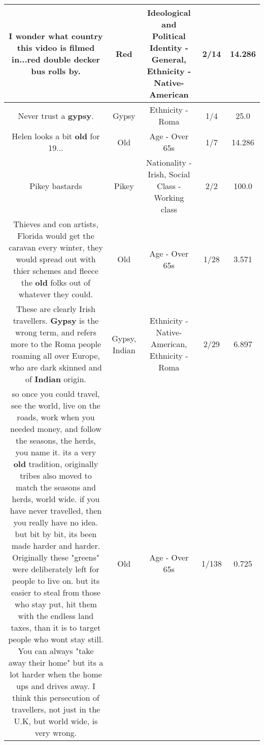 \documentclass[11pt]{article}
\newlength\mylength
\begin{document}
\begin{center}
\begin{longtable}{|C{.65\mylength}|C{.30\mylength}|C{.12\mylength}|C{.12\mylength}|C{.12\mylength}|}
  \small I wonder what country this video is filmed in...\textbf{r\textbf{ed}} double decker bus rolls by.\normalsize   & Red &  Ideological and Political Identity - General, Ethnicity - Native-American & 2/14 & 14.286 \\  \hline
  \small Never trust a \textbf{gypsy}.\normalsize   & Gypsy & Ethnicity - Roma & 1/4 & 25.0 \\  \hline
  \small Helen looks a bit \textbf{old} for 19...\normalsize   & Old & Age - Over 65s & 1/7 & 14.286 \\  \hline
  \small Pikey bastards\normalsize   & Pikey & Nationality - Irish, Social Class - Working class & 2/2 & 100.0 \\  \hline
  \small Thieves and con artists, Florida would get the caravan every winter, they would spread out with thier schemes and fleece the \textbf{old} folks out of whatever they could.\normalsize   & Old & Age - Over 65s & 1/28 & 3.571 \\  \hline
  \small These are clearly Irish travellers. \textbf{Gypsy} is the wrong term, and refers more to the Roma people roaming all over Europe, who are dark skinned and of \textbf{Indian} origin.\normalsize   & Gypsy, Indian & Ethnicity - Native-American, Ethnicity - Roma & 2/29 & 6.897 \\  \hline
  \small so once you could travel, see the world, live on the roads, work when you needed money, and follow the seasons, the herds, you name it. its a very \textbf{old} tradition, originally tribes also moved to match the seasons and herds, world wide. if you have never travelled, then you really have no idea. but bit by bit, its been made harder and harder. Originally these "greens" were deliberately left for people to live on. but its easier to steal from those who stay put, hit them with the endless land taxes, than it is to target people who wont stay still. You can always "take away their home" but its a lot harder when the home ups and drives away. I think this persecution of travellers, not just in the U.K, but world wide, is very wrong.\normalsize   & Old & Age - Over 65s & 1/138 & 0.725 \\  \hline

\end{longtable}
\end{center}
\end{document}
